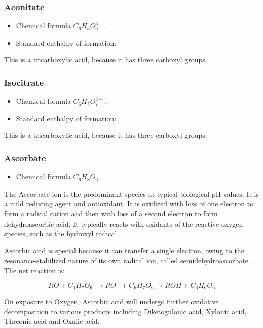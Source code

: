 \documentclass[a4paper,14pt]{extarticle}
\begin{document}
\subsubsection{Aconitate}
\begin{itemize}
    \item Chemical formula $C_6H_3O_6^{3-}$.
    \item Standard enthalpy of formation:
\end{itemize}
This is a tricarboxylic acid, because it has three carboxyl groups.

\subsubsection{Isocitrate}
\begin{itemize}
    \item Chemical formula $C_6H_5O_7^{3-}$.
    \item Standard enthalpy of formation:
\end{itemize}
This is a tricarboxylic acid, because it has three carboxyl groups.

\subsubsection{Ascorbate}
\begin{itemize}
    \item Chemical formula $C_6H_8O_6$.
\end{itemize}
The Ascorbate ion is the predominant species at typical biological pH values. It is a mild
reducing agent and antioxidant. It is oxidized with loss of one electron to form a radical
cation and then with loss of a second electron to form dehydroascorbic acid. It typically
reacts with oxidants of the reactive oxygen species, such as the hydroxyl radical.

Ascorbic acid is special because it can transfer a single electron, owing to the
resonance-stabilized nature of its own radical ion, called semidehydroascorbate. The net
reaction is:

\[
    RO + C_6H_7O_6^- \rightarrow RO^− + C_6H_7O_6 \rightarrow ROH + C_6H_6O_6
\]

On exposure to Oxygen, Ascorbic acid will undergo further oxidative decomposition to
various products including Diketogulonic acid, Xylonic acid, Threonic acid and Oxalic
acid.
\end{document}
